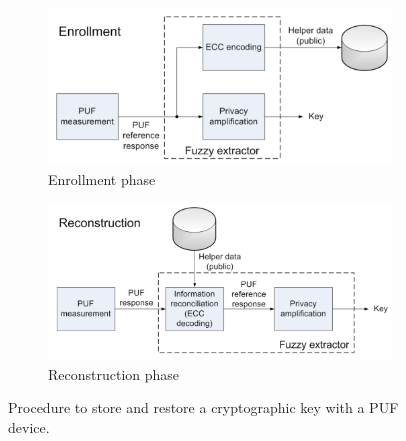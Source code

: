 \documentclass[USenglish]{article}
\begin{document}
\begin{figure}
	\centering
	\begin{subfigure}{.5\textwidth}
		\centering
		\includegraphics[width=.9\linewidth]{assets/puf_enrollment}
		\caption{Enrollment phase}
		\label{fig:puf_enrollment}
	\end{subfigure}%
	\begin{subfigure}{.5\textwidth}
		\centering
		\includegraphics[width=.9\linewidth]{assets/puf_reconstruction}
		\caption{Reconstruction phase}
		\label{fig:puf_reconstruction}
	\end{subfigure}
	\caption{Procedure to store and restore a cryptographic key with a PUF device.}
	\label{fig:puf_key_storage}
\end{figure}
\end{document}
